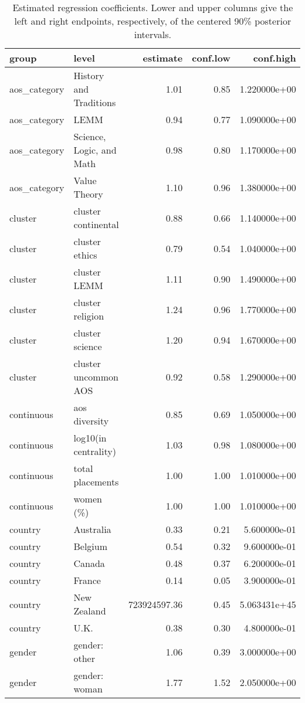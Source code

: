 \begin{table}

\caption{\label{tab:estimates}Estimated regression coefficients.  Lower and upper columns give the left and right endpoints, respectively, of the centered 90\% posterior intervals.}
\centering
\begin{tabular}[t]{llrrr}
\toprule
group & level & estimate & conf.low & conf.high\\
\midrule
aos\_category & History and Traditions & 1.01 & 0.85 & 1.220000e+00\\
aos\_category & LEMM & 0.94 & 0.77 & 1.090000e+00\\
aos\_category & Science, Logic, and Math & 0.98 & 0.80 & 1.170000e+00\\
aos\_category & Value Theory & 1.10 & 0.96 & 1.380000e+00\\
cluster & cluster continental & 0.88 & 0.66 & 1.140000e+00\\
\addlinespace
cluster & cluster ethics & 0.79 & 0.54 & 1.040000e+00\\
cluster & cluster LEMM & 1.11 & 0.90 & 1.490000e+00\\
cluster & cluster religion & 1.24 & 0.96 & 1.770000e+00\\
cluster & cluster science & 1.20 & 0.94 & 1.670000e+00\\
cluster & cluster uncommon AOS & 0.92 & 0.58 & 1.290000e+00\\
\addlinespace
continuous & aos diversity & 0.85 & 0.69 & 1.050000e+00\\
continuous & log10(in centrality) & 1.03 & 0.98 & 1.080000e+00\\
continuous & total placements & 1.00 & 1.00 & 1.010000e+00\\
continuous & women (\%) & 1.00 & 1.00 & 1.010000e+00\\
country & Australia & 0.33 & 0.21 & 5.600000e-01\\
\addlinespace
country & Belgium & 0.54 & 0.32 & 9.600000e-01\\
country & Canada & 0.48 & 0.37 & 6.200000e-01\\
country & France & 0.14 & 0.05 & 3.900000e-01\\
country & New Zealand & 723924597.36 & 0.45 & 5.063431e+45\\
country & U.K. & 0.38 & 0.30 & 4.800000e-01\\
\addlinespace
gender & gender: other & 1.06 & 0.39 & 3.000000e+00\\
gender & gender: woman & 1.77 & 1.52 & 2.050000e+00\\

\end{tabular}
\end{table}
